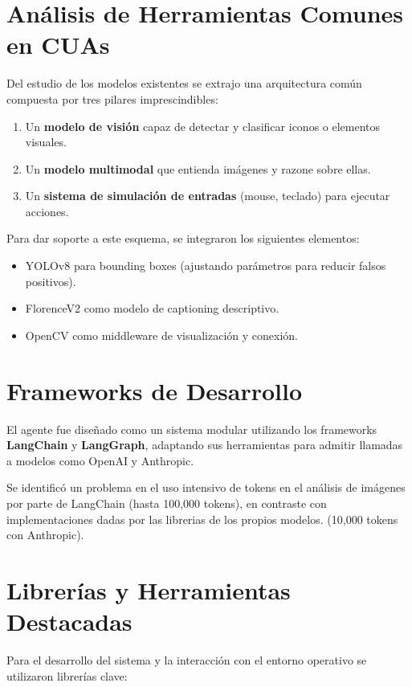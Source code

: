 \section{Análisis de Herramientas Comunes en CUAs}

Del estudio de los modelos existentes se extrajo una arquitectura común compuesta por tres pilares imprescindibles:

\begin{enumerate}
    \item Un \textbf{modelo de visión} capaz de detectar y clasificar iconos o elementos visuales.
    \item Un \textbf{modelo multimodal} que entienda imágenes y razone sobre ellas.
    \item Un \textbf{sistema de simulación de entradas} (mouse, teclado) para ejecutar acciones.
\end{enumerate}

Para dar soporte a este esquema, se integraron los siguientes elementos:
\begin{itemize}
    \item YOLOv8 para bounding boxes (ajustando parámetros para reducir falsos positivos).
    \item FlorenceV2 como modelo de captioning descriptivo.
    \item OpenCV como middleware de visualización y conexión.
\end{itemize}

\section{Frameworks de Desarrollo}

El agente fue diseñado como un sistema modular utilizando los frameworks \textbf{LangChain} y \textbf{LangGraph}, adaptando sus herramientas para admitir llamadas a modelos como OpenAI y Anthropic.

Se identificó un problema en el uso intensivo de tokens en el análisis de imágenes por parte de LangChain (hasta 100,000 tokens), en contraste con implementaciones dadas por las librerias de los propios modelos. (10,000 tokens con Anthropic).

\section{Librerías y Herramientas Destacadas}

Para el desarrollo del sistema y la interacción con el entorno operativo se utilizaron librerías clave:

